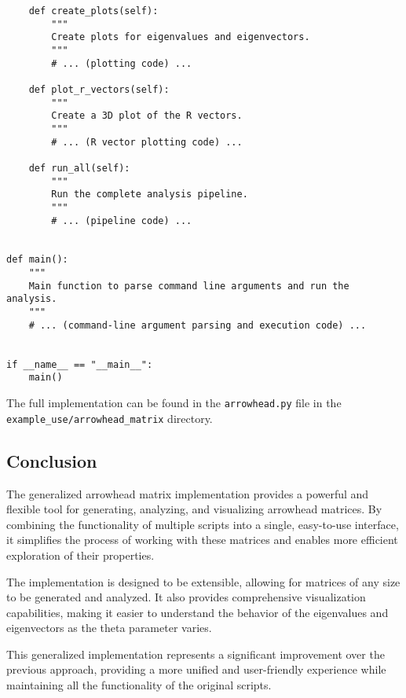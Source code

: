 \begin{verbatim}
    def create_plots(self):
        """
        Create plots for eigenvalues and eigenvectors.
        """
        # ... (plotting code) ...
    
    def plot_r_vectors(self):
        """
        Create a 3D plot of the R vectors.
        """
        # ... (R vector plotting code) ...
    
    def run_all(self):
        """
        Run the complete analysis pipeline.
        """
        # ... (pipeline code) ...


def main():
    """
    Main function to parse command line arguments and run the analysis.
    """
    # ... (command-line argument parsing and execution code) ...


if __name__ == "__main__":
    main()
\end{verbatim}

The full implementation can be found in the \texttt{arrowhead.py} file in the \texttt{example\_use/arrowhead\_matrix} directory.

\subsection{Conclusion}

The generalized arrowhead matrix implementation provides a powerful and flexible tool for generating, analyzing, and visualizing arrowhead matrices. By combining the functionality of multiple scripts into a single, easy-to-use interface, it simplifies the process of working with these matrices and enables more efficient exploration of their properties.

The implementation is designed to be extensible, allowing for matrices of any size to be generated and analyzed. It also provides comprehensive visualization capabilities, making it easier to understand the behavior of the eigenvalues and eigenvectors as the theta parameter varies.

This generalized implementation represents a significant improvement over the previous approach, providing a more unified and user-friendly experience while maintaining all the functionality of the original scripts.
